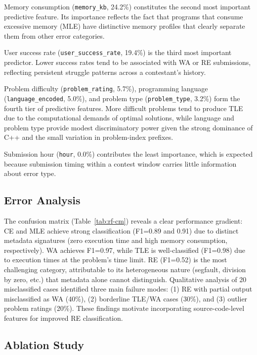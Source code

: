 \documentclass[acmsmall]{acmart}
\begin{document}
Memory consumption (\texttt{memory\_kb}, 24.2\%) constitutes the second most
important predictive feature. Its importance reflects the fact that programs
that consume excessive memory (MLE) have distinctive memory profiles that
clearly separate them from other error categories.

User success rate (\texttt{user\_success\_rate}, 19.4\%) is the third most
important predictor. Lower success rates tend to be associated with WA or RE
submissions, reflecting persistent struggle patterns across a contestant's
history.

Problem difficulty (\texttt{problem\_rating}, 5.7\%), programming language
(\texttt{language\_encoded}, 5.0\%), and problem type (\texttt{problem\_type},
3.2\%) form the fourth tier of predictive features. More difficult problems
tend to produce TLE due to the computational demands of optimal
solutions, while language and problem type provide modest discriminatory power
given the strong dominance of C++ and the small variation in problem-index
prefixes.

Submission hour (\texttt{hour}, 0.0\%) contributes the least importance, which
is expected because submission timing within a contest window carries little
information about error type.

\subsection{Error Analysis}

The confusion matrix (Table~\ref{tab:rf-cm}) reveals a clear performance
gradient: CE and MLE achieve strong classification (F1=0.89 and 0.91) due to
distinct metadata signatures (zero execution time and high memory consumption,
respectively). WA achieves F1=0.97, while TLE is well-classified (F1=0.98)
due to execution times at the problem's time limit. RE (F1=0.52) is the most
challenging category, attributable to its heterogeneous nature (segfault,
division by zero, etc.) that metadata alone cannot distinguish. Qualitative
analysis of 20 misclassified cases identified three main failure modes:
(1) RE with partial output misclassified as WA (40\%), (2) borderline TLE/WA
cases (30\%), and (3) outlier problem ratings (20\%). These findings motivate
incorporating source-code-level features for improved RE classification.

\subsection{Ablation Study}
\label{sec:ablation}
\end{document}
